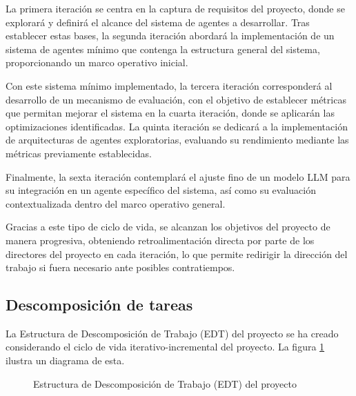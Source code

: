 La primera iteración se centra en la captura de requisitos del proyecto, donde se explorará y definirá el alcance del sistema de agentes a desarrollar. Tras establecer estas bases, la segunda iteración abordará la implementación de un sistema de agentes mínimo que contenga la estructura general del sistema, proporcionando un marco operativo inicial.

Con este sistema mínimo implementado, la tercera iteración corresponderá al desarrollo de un mecanismo de evaluación, con el objetivo de establecer métricas que permitan mejorar el sistema en la cuarta iteración, donde se aplicarán las optimizaciones identificadas. La quinta iteración se dedicará a la implementación de arquitecturas de agentes exploratorias, evaluando su rendimiento mediante las métricas previamente establecidas.

Finalmente, la sexta iteración contemplará el ajuste fino de un modelo LLM para su integración en un agente específico del sistema, así como su evaluación contextualizada dentro del marco operativo general.

Gracias a este tipo de ciclo de vida, se alcanzan los objetivos del proyecto de manera progresiva, obteniendo retroalimentación directa por parte de los directores del proyecto en cada iteración, lo que permite redirigir la dirección del trabajo si fuera necesario ante posibles contratiempos.

\subsection{Descomposición de tareas}
La Estructura de Descomposición de Trabajo (EDT) del proyecto se ha creado considerando el ciclo de vida iterativo-incremental del proyecto. La figura \ref{fig:edt} ilustra un diagrama de esta. 

\begin{figure}[h]
  \centering
  \caption{Estructura de Descomposición de Trabajo (EDT) del proyecto}
  \label{fig:edt}
\end{figure}


